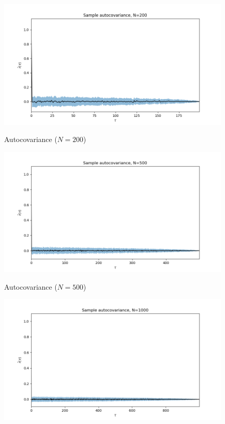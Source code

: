 \documentclass[11pt]{article}
\begin{document}
\begin{exercise}
\begin{figure}
    \centering
    \begin{minipage}[t]{0.3\textwidth}
    \centerline{\includegraphics[width=\textwidth]{sample_autocovariance200.png}}
    \centerline{Autocovariance ($N=200$)}
    \end{minipage}
    \begin{minipage}[t]{0.3\textwidth}
    \centerline{\includegraphics[width=\textwidth]{sample_autocovariance500.png}}
    \centerline{Autocovariance ($N=500$)}
    \end{minipage}
    \begin{minipage}[t]{0.3\textwidth}
    \centerline{\includegraphics[width=\textwidth]{sample_autocovariance1000.png}}

\end{minipage}
\end{figure}
\end{exercise}
\end{document}
